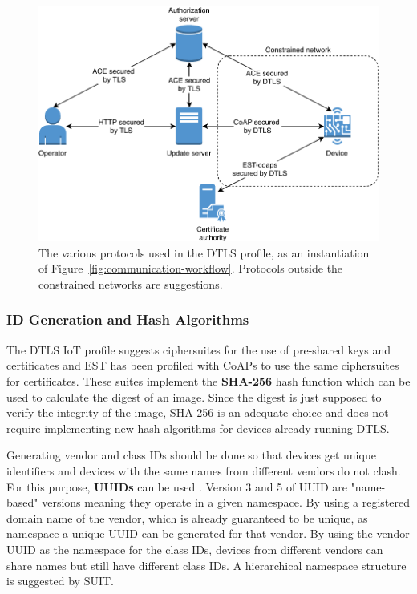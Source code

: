 \documentclass[0-thesis.tex]{subfiles}
\begin{document}
\begin{figure}[h]
    \caption[The various protocols used in the DTLS profile.]
        {The various protocols used in the DTLS profile, as an instantiation of
            Figure~\ref{fig:communication-workflow}. Protocols outside the constrained networks are suggestions.}
    \label{fig:dtls-profile}
    \includegraphics{images/dtls-profile.pdf}
\end{figure}

\subsubsection{ID Generation and Hash Algorithms}
\label{sssec:hash-id-algorithm}
The DTLS IoT profile suggests ciphersuites for the use of pre-shared keys and certificates
and EST has been profiled with CoAPs to use the same ciphersuites for certificates. These
suites implement the \textbf{SHA-256} hash function which can be used to calculate the
digest of an image. Since the digest is just supposed to verify the integrity of the
image, SHA-256 is an adequate choice and does not require implementing new hash algorithms
for devices already running DTLS.

Generating vendor and class IDs should be done so that devices get unique identifiers and
devices with the same names from different vendors do not clash. For this purpose,
\textbf{UUIDs} can be used \parencite{rfc4122}. Version 3 and 5 of UUID are "name-based"
versions meaning they operate in a given namespace. By using a registered domain name of
the vendor, which is already guaranteed to be unique, as namespace a unique UUID can be
generated for that vendor. By using the vendor UUID as the namespace for the class IDs,
devices from different vendors can share names but still have different class IDs. A
hierarchical namespace structure is suggested by SUIT.
\end{document}
